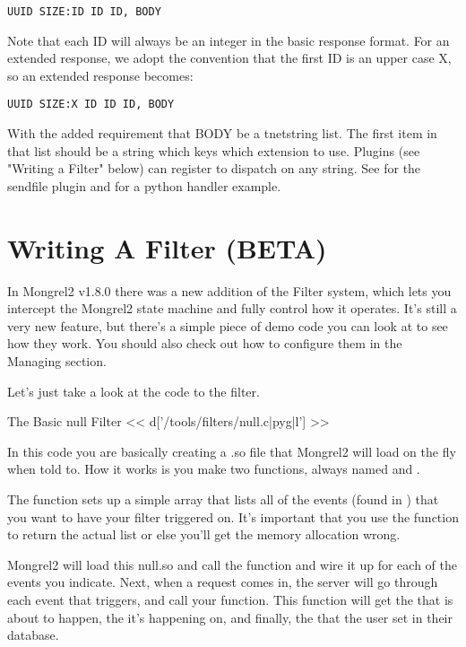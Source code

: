 \begin{Verbatim}
UUID SIZE:ID ID ID, BODY
\end{Verbatim}

Note that each ID will always be an integer in the basic response format.  For
an extended response, we adopt the convention that the first ID is an upper
case X, so an extended response becomes:

\begin{Verbatim}
UUID SIZE:X ID ID ID, BODY
\end{Verbatim}

With the added requirement that BODY be a tnetstring list.  The first item in
that list should be a string which keys which extension to use.  Plugins (see
"Writing a Filter" below) can register to dispatch on any string.  See
 for the sendfile plugin and
 for a python handler example.


\section{Writing A Filter (BETA)}

In Mongrel2 v1.8.0 there was a new addition of the Filter system, which
lets you intercept the Mongrel2 state machine and fully control how it 
operates.  It's still a very new feature, but there's a simple piece of
demo code you can look at to see how they work.  You should also check
out how to configure them in the Managing section.

Let's just take a look at the code to the 
filter.


\begin{code}{The Basic null Filter}
<< d['/tools/filters/null.c|pyg|l'] >>
\end{code}

In this code you are basically creating a .so file that Mongrel2 
will load on the fly when told to.  How it works is you make
two functions, always named  and .

The  function sets up a simple array that lists all
of the events (found in ) that you want to have your
filter triggered on.  It's important that you use the 
function to return the actual list or else you'll get the memory allocation
wrong.

Mongrel2 will load this null.so and call the  function
and wire it up for each of the events you indicate.  Next, when a request
comes in, the server will go through each event that triggers, and
call your  function.  This function will
get the  that is about to happen, the 
it's happening on, and finally, the  that the user
set in their  database.

